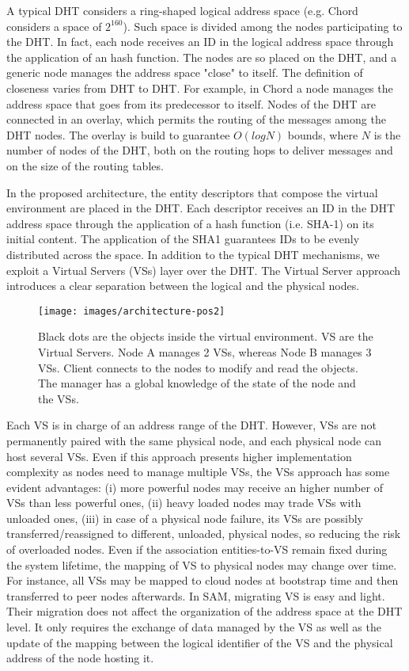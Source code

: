 \documentclass[final,10pt,a5paper]{phdimt}
\theoremstyle{definition}
\begin{document}
A typical DHT considers a ring-shaped logical address space (e.g. Chord \cite{Stoica2003} considers a space of $2^{160}$).
Such space is divided among the nodes participating to the DHT.
In fact, each node receives an ID in the logical address space through the application of an hash function.
The nodes are so placed on the DHT, and a generic node manages the address space "close" to itself.
The definition of closeness varies from DHT to DHT. 
For example, in Chord a node manages the address space that goes from its predecessor to itself.
Nodes of the DHT are connected in an overlay, which permits the routing of the messages among the DHT nodes.
The overlay is build to guarantee $O(logN)$ bounds, where $N$ is the number of
nodes of the DHT, both on the routing hops to deliver messages and on the size of the routing tables.

In the proposed architecture, the entity descriptors that compose the virtual environment are placed in the DHT.
Each descriptor receives an ID in the DHT address space through the application of a hash function (i.e. SHA-1) on its initial content.
The application of the SHA1 guarantees IDs to be evenly distributed across the space. 
In addition to the typical DHT mechanisms, we exploit a Virtual Servers (VSs) \cite{Godfrey2004} layer over the DHT.
The Virtual Server approach introduces a clear separation between the logical and the physical nodes.


\begin{figure}
\centering
\texttt{[image: images/architecture-pos2]}
\caption{Black dots are the objects inside the virtual environment. VS are the Virtual Servers. Node A manages 2 VSs, whereas Node B manages 3 VSs. Client connects to the nodes to modify and read the objects. The manager has a global knowledge of the state of the node and the VSs.}\label{fig:sam-arch}
\end{figure}


Each VS is in charge of an address range of the DHT. However, VSs are not permanently paired with the same physical node, and each physical node can host several VSs. Even if this approach presents higher implementation complexity as nodes need to manage multiple VSs, the VSs approach has some evident advantages: (i) more powerful nodes may receive an higher number of VSs than less powerful ones, (ii) heavy loaded nodes may trade VSs with unloaded ones, (iii) in case of a physical node failure, its VSs are possibly transferred/reassigned to different, unloaded, physical nodes, so reducing the risk of overloaded nodes.
Even if the association entities-to-VS remain fixed during the system lifetime, the mapping of VS to physical nodes may change over time. For instance, all VSs may be mapped to cloud nodes at bootstrap time and then transferred to peer nodes afterwards.
In SAM, migrating VS is easy and light. 
Their migration does not affect the organization of the address space at the DHT level.
It only requires the exchange of data managed by the VS as well as the update of the mapping between the logical identifier of the VS and the physical address of the node hosting it.
\end{document}
